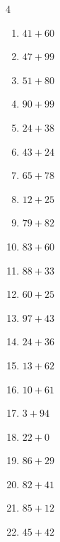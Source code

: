 \begin{multicols}{4}
\begin{enumerate}
  \item $41+60$
        \phantom{$=101$}

  \item $47+99$
        \phantom{$=146$}

  \item $51+80$
        \phantom{$=131$}

  \item $90+99$
        \phantom{$=189$}

  \item $24+38$
        \phantom{$=62$}

  \item $43+24$
        \phantom{$=67$}

  \item $65+78$
        \phantom{$=143$}

  \item $12+25$
        \phantom{$=37$}

  \item $79+82$
        \phantom{$=161$}

  \item $83+60$
        \phantom{$=143$}

  \item $88+33$
        \phantom{$=121$}

  \item $60+25$
        \phantom{$=85$}

  \item $97+43$
        \phantom{$=140$}

  \item $24+36$
        \phantom{$=60$}

  \item $13+62$
        \phantom{$=75$}

  \item $10+61$
        \phantom{$=71$}

  \item $3+94$
        \phantom{$=97$}

  \item $22+0$
        \phantom{$=22$}

  \item $86+29$
        \phantom{$=115$}

  \item $82+41$
        \phantom{$=123$}

  \item $85+12$
        \phantom{$=97$}

  \item $45+42$
        \phantom{$=87$}


\end{enumerate}
\end{multicols}
